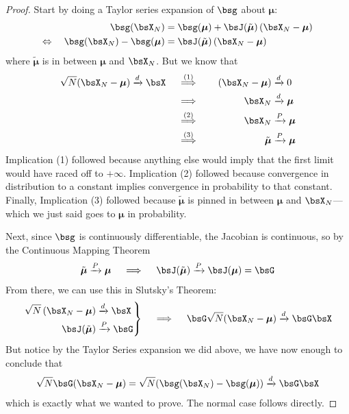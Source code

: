 \documentclass[12pt]{article}
\theoremstyle{plain}
\theoremstyle{definition}
\theoremstyle{remark}
\newcommand{\bsmu}{\boldsymbol{\mu}}
\newenvironment{rcases}
  {\left.\begin{aligned}}
  {\end{aligned}\right\rbrace}
\newcommand{\pto}{\xrightarrow{P}}
\newcommand{\dto}{\xrightarrow{d}}
\begin{document}
\begin{proof}
Start by doing a Taylor series expansion of $\bsg$ about $\bsmu$:
\begin{align*}
  \bsg(\bsX_N)
  &=
  \bsg(\bsmu)
  + \bsJ(\tilde{\bsmu}) \left( \bsX_N - \bsmu \right)
  \\
  \Leftrightarrow\quad
  \bsg(\bsX_N) - \bsg(\bsmu)
  &=
  \bsJ(\tilde{\bsmu}) \left( \bsX_N - \bsmu \right)
\end{align*}
where $\tilde{\bsmu}$ is in between $\bsmu$ and $\bsX_N$.
But we know that
\begin{alignat*}{3}
  \sqrt{N}(\bsX_N-\bsmu)
  \dto \bsX
  \quad\overset{(1)}{\implies}&&\quad
  (\bsX_N-\bsmu)
  &\dto 0 \\
  \quad\implies&&\quad
  \bsX_N
  &\dto \bsmu \\
  \quad\overset{(2)}{\implies}&&\quad
  \bsX_N
  &\pto \bsmu \\
  \quad\overset{(3)}{\implies}&&\quad
  \tilde{\bsmu}
  &\pto \bsmu
\end{alignat*}
Implication (1) followed because anything else would imply that the
first limit would have raced off to $+\infty$. Implication (2) followed
because convergence in distribution to a constant implies convergence in
probability to that constant.
Finally, Implication (3) followed because $\tilde{\bsmu}$ is pinned in
between $\bsmu$ and $\bsX_N$---which we just said goes to $\bsmu$ in
probability.

Next, since $\bsg$ is continuously differentiable, the Jacobian is
continuous, so by the Continuous Mapping Theorem
\begin{align*}
  \tilde{\bsmu} \pto \bsmu
  \quad\implies\quad
  \bsJ(\tilde{\bsmu})
  \pto \bsJ(\bsmu) = \bsG
\end{align*}
From there, we can use this in Slutsky's Theorem:
\begin{align*}
  \begin{rcases}
  \sqrt{N}\left(\bsX_N-\bsmu\right) &\dto \bsX \\
  \bsJ(\tilde{\bsmu}) &\pto \bsG
  \end{rcases}
  \quad\implies\quad
  \bsG \sqrt{N} (\bsX_N-\bsmu) \dto
  \bsG \bsX
\end{align*}
But notice by the Taylor Series expansion we did above, we have now
enough to conclude that
\begin{align*}
  \sqrt{N} \bsG (\bsX_N-\bsmu)
  = \sqrt{N}(\bsg(\bsX_N)-\bsg(\bsmu))
  \dto \bsG\bsX
\end{align*}
which is exactly what we wanted to prove.
The normal case follows directly.
\end{proof}
\end{document}
